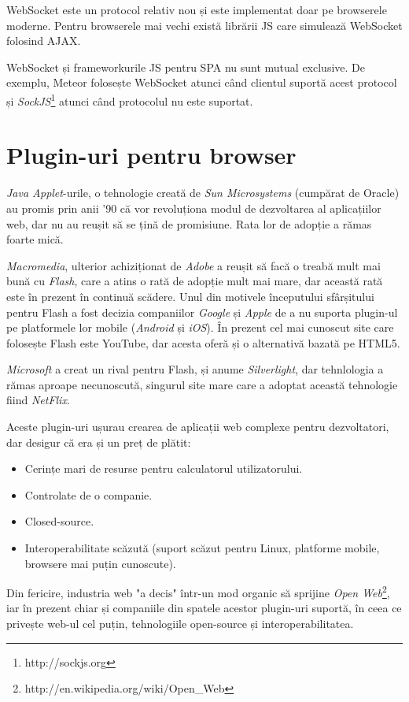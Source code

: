 WebSocket este un protocol relativ nou și este implementat doar pe browserele moderne.
Pentru browserele mai vechi există librării JS care simulează WebSocket folosind
AJAX.

WebSocket și frameworkurile JS pentru SPA nu sunt mutual
exclusive. De exemplu, Meteor folosește WebSocket atunci când clientul suportă
acest protocol și \emph{SockJS}\footnote{http://sockjs.org} atunci când protocolul 
nu este suportat.

\section{Plugin-uri pentru browser}
\emph{Java Applet}-urile, o tehnologie creată de \emph{Sun Microsystems} 
(cumpărat de Oracle) au promis prin anii '90 că vor revoluționa modul de dezvoltarea
al aplicațiilor web, dar nu au reușit să se țină de promisiune. Rata lor de adopție
a rămas foarte mică.

\emph{Macromedia}, ulterior achiziționat de \emph{Adobe} a
reușit să facă o treabă mult mai bună cu \emph{Flash}, care a atins o rată de
adopție mult mai mare, dar această rată este în prezent în continuă scădere. Unul
din motivele începutului sfârșitului pentru Flash a fost decizia companiilor
\emph{Google} și \emph{Apple} de a nu suporta plugin-ul pe platformele lor mobile
(\emph{Android} și \emph{iOS}). În prezent cel mai cunoscut site care folosește
Flash este YouTube, dar acesta oferă și o alternativă bazată pe HTML5.

\emph{Microsoft} a creat un rival pentru Flash, și anume \emph{Silverlight},
dar tehnlologia a rămas aproape necunoscută, singurul site mare care a adoptat
această tehnologie fiind \emph{NetFlix}.

Aceste plugin-uri ușurau crearea de aplicații web complexe pentru dezvoltatori,
dar desigur că era și un preț de plătit:
\begin{itemize}
\item Cerințe mari de resurse pentru calculatorul utilizatorului.
\item Controlate de o companie.
\item Closed-source.
\item Interoperabilitate scăzută (suport scăzut pentru Linux, platforme mobile,
      browsere mai puțin cunoscute).
\end{itemize}
Din fericire, industria web "a decis" într-un mod organic să sprijine 
\emph{Open Web}\footnote{http://en.wikipedia.org/wiki/Open\_Web}, iar în prezent 
chiar și companiile din spatele acestor plugin-uri suportă,
în ceea ce privește web-ul cel puțin, tehnologiile open-source
și interoperabilitatea.


